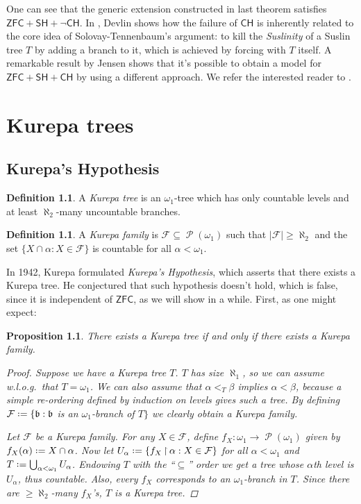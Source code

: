 \documentclass[11pt,a4paper]{report}
\newtheorem{proposition}[theorem]{Proposition}
\theoremstyle{definition}
\newtheorem{defn}[theorem]{Definition}
\theoremstyle{num.custom-title}
\theoremstyle{custom-title}
\DeclareMathOperator{\PP}{\mathcal{P}}
\DeclareMathOperator{\sse}{\subseteq}
\DeclareMathOperator{\restr}{\upharpoonright}
\newcommand{\ZFC}{\ensuremath{\mathsf{ZFC}}\xspace}
\newcommand{\CH}{\ensuremath{\mathsf{CH}}\xspace}
\newcommand{\SH}{\ensuremath{\mathsf{SH}}\xspace}
\newcommand{\F}{\mathcal{F}}
\newcommand*{\defeq}{\mathrel{\rlap{%
                     \raisebox{0.3ex}{$\cdot$}}%
                     \raisebox{-0.3ex}{$\cdot$}}%
                     =}
\begin{document}
One can see that the generic extension constructed in last theorem satisfies $\ZFC + \SH + \neg\CH$. In \cite{Dev1974}, Devlin shows how the failure of \CH is inherently related to the core idea of Solovay-Tennenbaum's argument: to kill the \emph{Suslinity} of a Suslin tree $T$ by adding a branch to it, which is achieved by forcing with $T$ itself. A remarkable result by Jensen shows that it's possible to obtain a model for $\ZFC + \SH + \CH$ by using a different approach. We refer the interested reader to \cite{Dev1974}.



\chapter{Kurepa trees}

\section{Kurepa's Hypothesis}

\begin{defn}
A \emph{Kurepa tree} is an $\omega_1$-tree which has only countable levels and at least $\aleph_2$-many uncountable branches.
\end{defn}

\begin{defn}
A \emph{Kurepa family} is $\F \sse \PP(\omega_1)$ such that $|\F| \geq \aleph_2$ and the set $\{X \cap \alpha : X \in \F\}$ is countable for all $\alpha < \omega_1$.
\end{defn}

In 1942, Kurepa formulated \emph{Kurepa's Hypothesis}, which asserts that there exists a Kurepa tree. He conjectured that such hypothesis doesn't hold, which is false, since it is independent of \ZFC, as we will show in a while. First, as one might expect:

\begin{proposition}
There exists a Kurepa tree if and only if there exists a Kurepa family.
\begin{proof}
Suppose we have a Kurepa tree $T$. $T$ has size $\aleph_1$, so we can assume w.l.o.g.\ that $T = \omega_1$. We can also assume that $\alpha <_T \beta$ implies $\alpha < \beta$, because a simple re-ordering defined by induction on levels gives such a tree. By defining $\F \defeq \{ \mathfrak{b} : \mathfrak{b}$ is an $\omega_1$-branch of $T \}$ we clearly obtain a Kurepa family.

Let $\F$ be a Kurepa family. For any $X \in \F$, define $f_X \colon \omega_1 \to \PP(\omega_1)$ given by $f_X(\alpha) \defeq X \cap \alpha$. Now let $U_\alpha \defeq \{ f_X \restr \alpha : X \in \F \}$ for all $\alpha < \omega_1$ and $T \defeq \bigcup_{\alpha < \omega_1} U_\alpha$. Endowing $T$ with the ``$\sse$'' order we get a tree whose $\alpha$th level is $U_\alpha$, thus countable. Also, every $f_X$ corresponds to an $\omega_1$-branch in $T$. Since there are $\geq \aleph_2$-many $f_X$'s, $T$ is a Kurepa tree.
\end{proof}
\end{proposition}
\end{document}

